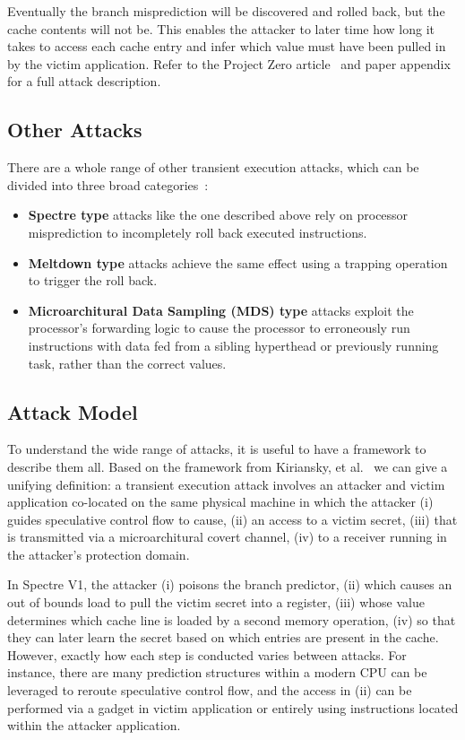 Eventually the branch misprediction will be discovered and rolled back, but the cache contents will not be.
This enables the attacker to later time how long it takes to access each cache entry and infer which value must have been pulled in by the victim application.
Refer to the Project Zero article~\cite{project-zero:spectre} and paper appendix~\cite{kocher:spectre} for a full attack description.

\subsection{Other Attacks}
There are a whole range of other transient execution attacks, which can be divided into three broad categories~\cite{hill:survey}:
\begin{itemize}
\item \textbf{Spectre type} attacks like the one described above rely on processor misprediction to incompletely roll back executed instructions.
\item \textbf{Meltdown type} attacks achieve the same effect using a trapping operation to trigger the roll back.
\item \textbf{Microarchitural Data Sampling (MDS) type} attacks exploit the processor's forwarding logic to cause the processor to erroneously run instructions with data fed from a sibling hyperthead or previously running task, rather than the correct values.
\end{itemize}

\subsection{Attack Model}
To understand the wide range of attacks, it is useful to have a framework to describe them all.
Based on the framework from Kiriansky, et al.~\cite{kiriansky:dawg} we can give a unifying definition: a transient execution attack involves an attacker and victim application co-located on the same physical machine in which the attacker (i) guides speculative control flow to cause, (ii) an access to a victim secret, (iii) that is transmitted via a microarchitural covert channel, (iv) to a receiver running in the attacker's protection domain. 

In Spectre V1, the attacker (i) poisons the branch predictor, (ii) which causes an out of bounds load to pull the victim secret into a register, (iii) whose value determines which cache line is loaded by a second memory operation, (iv) so that they can later learn the secret based on which entries are present in the cache.
However, exactly how each step is conducted varies between attacks.
For instance, there are many prediction structures within a modern CPU can be leveraged to reroute speculative control flow, and the access in (ii) can be performed via a gadget in victim application or entirely using instructions located within the attacker application.

